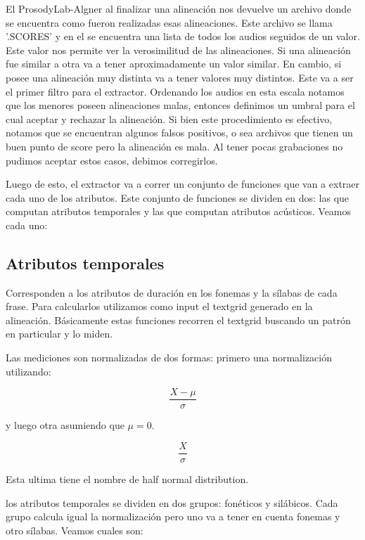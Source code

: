 \documentclass[11pt,a4paper,twoside]{tesis}
\begin{document}
El ProsodyLab-Algner al finalizar una alineación nos devuelve un archivo donde se encuentra como fueron realizadas esas alineaciones. Este archivo se llama '.SCORES' y en el se encuentra una lista de todos los audios seguidos de un valor. Este valor nos permite ver la verosimilitud de las alineaciones. Si una alineación fue similar a otra va a tener aproximadamente un valor similar. En cambio, si posee una alineación muy distinta va a tener valores muy distintos. Este va a ser el primer filtro para el extractor. Ordenando los audios en esta escala notamos que los menores poseen alineaciones malas, entonces definimos un umbral para el cual aceptar y rechazar la alineación. Si bien este procedimiento es efectivo, notamos que se encuentran algunos falsos positivos, o sea archivos que tienen un buen punto de score pero la alineación es mala. Al tener pocas grabaciones no pudimos aceptar estos casos, debimos corregirlos.

Luego de esto, el extractor va a correr un conjunto de funciones que van a extraer cada uno de los atributos. Este conjunto de funciones se dividen en dos: las que computan atributos temporales y las que computan atributos acústicos. Veamos cada uno:

\subsection{Atributos temporales}

Corresponden a los atributos de duración en los fonemas y la sílabas de cada frase. Para calcularlos utilizamos como input el textgrid generado en la alineación. Básicamente estas funciones recorren el textgrid buscando un patrón en particular y lo miden.

Las mediciones son normalizadas de dos formas: primero una normalización utilizando:

\hspace{2cm} \[\frac{X - \mu }{ \sigma }\]

y luego otra asumiendo que $\mu = 0$. 

\hspace{2cm} \[\frac{X}{ \sigma }\]

Esta ultima tiene el nombre de half normal distribution.


los atributos temporales se dividen en dos grupos: fonéticos y silábicos. Cada grupo calcula igual la normalización pero uno va a tener en cuenta fonemas y otro sílabas. Veamos cuales son:
\end{document}
